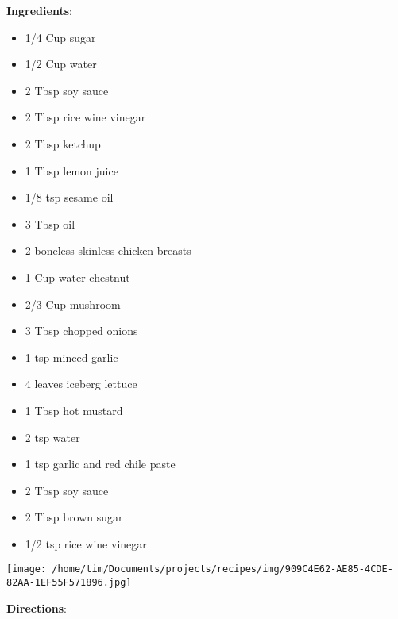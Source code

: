 \documentclass[11pt, twoside, openany]{book}
\begin{document}
\begin{minipage}[t]{0.8\linewidth}
\textbf{Ingredients}:\vspace{-3mm}
\begin{multicols}{2}
\begin{itemize}\setlength\itemsep{-1mm}
\item 1/4 Cup sugar
\item 1/2 Cup water
\item 2 Tbsp soy sauce
\item 2 Tbsp rice wine vinegar
\item 2 Tbsp ketchup
\item 1 Tbsp lemon juice
\item 1/8 tsp sesame oil
\item 3 Tbsp oil
\item 2 boneless skinless chicken breasts
\item 1 Cup water chestnut
\item 2/3 Cup mushroom
\item 3 Tbsp chopped onions
\item 1 tsp minced garlic
\item 4 leaves iceberg lettuce
\item 1 Tbsp hot mustard
\item 2 tsp water
\item 1 tsp garlic and red chile paste
\item 2 Tbsp soy sauce
\item 2 Tbsp brown sugar
\item 1/2 tsp rice wine vinegar
\end{itemize}
\end{multicols}
\end{minipage}
\begin{minipage}[t]{0.2\linewidth}
\centering \strut\vspace*{-\baselineskip}\newline
\texttt{[image: /home/tim/Documents/projects/recipes/img/909C4E62-AE85-4CDE-82AA-1EF55F571896.jpg]}\\
\end{minipage}\vspace{3mm}
\textbf{Directions}:
\end{document}
